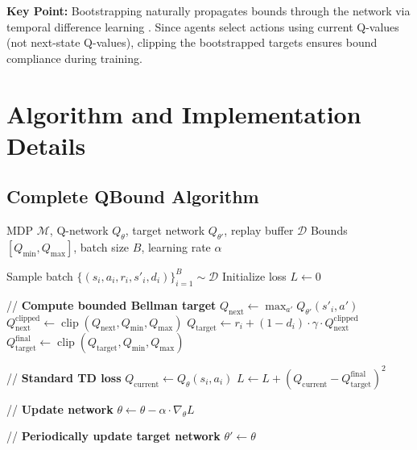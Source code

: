 \documentclass[11pt]{article}
\theoremstyle{definition}
\theoremstyle{remark}
\DeclareMathOperator{\clip}{clip}
\begin{document}
\textbf{Key Point:} Bootstrapping naturally propagates bounds through the network via temporal difference learning \citep{sutton2018reinforcement}. Since agents select actions using current Q-values (not next-state Q-values), clipping the bootstrapped targets ensures bound compliance during training.

\section{Algorithm and Implementation Details}

\subsection{Complete QBound Algorithm}

\begin{algorithm}[H]
\caption{QBound: Bounded Q-Value Learning}
\label{alg:qclip}
\begin{algorithmic}[1]
\Require MDP $\mathcal{M}$, Q-network $Q_\theta$, target network $Q_{\theta'}$, replay buffer $\mathcal{D}$
\Require Bounds $[Q_{\min}, Q_{\max}]$, batch size $B$, learning rate $\alpha$

    \State Sample batch $\{(s_i, a_i, r_i, s'_i, d_i)\}_{i=1}^B \sim \mathcal{D}$
    \State Initialize loss $L \gets 0$

        \State // \textbf{Compute bounded Bellman target}
        \State $Q_{\text{next}} \gets \max_{a'} Q_{\theta'}(s'_i, a')$ 
        \State $Q_{\text{next}}^{\text{clipped}} \gets \clip(Q_{\text{next}}, Q_{\min}, Q_{\max})$ 
        \State $Q_{\text{target}} \gets r_i + (1 - d_i) \cdot \gamma \cdot Q_{\text{next}}^{\text{clipped}}$
        \State $Q_{\text{target}}^{\text{final}} \gets \clip(Q_{\text{target}}, Q_{\min}, Q_{\max})$ 

        \State // \textbf{Standard TD loss}
        \State $Q_{\text{current}} \gets Q_\theta(s_i, a_i)$ 
        \State $L \gets L + (Q_{\text{current}} - Q_{\text{target}}^{\text{final}})^2$
    \EndFor

    \State // \textbf{Update network}
    \State $\theta \gets \theta - \alpha \cdot \nabla_\theta L$

    \State // \textbf{Periodically update target network}
        \State $\theta' \gets \theta$
    \EndIf
\EndFunction
\end{algorithmic}
\end{algorithm}
\end{document}
